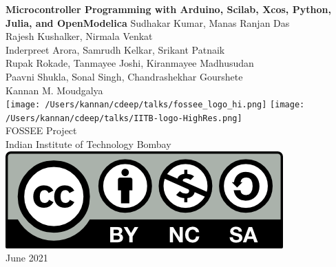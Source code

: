 \begin{center}
{\bf {\Huge Microcontroller Programming with Arduino, Scilab, Xcos,
    Python, Julia, and OpenModelica}}
\vfill
%
Sudhakar Kumar, Manas Ranjan Das \\
Rajesh Kushalker, Nirmala Venkat \\
Inderpreet Arora, Samrudh Kelkar, Srikant Patnaik \\
Rupak Rokade, Tanmayee Joshi, Kiranmayee Madhusudan \\
Paavni Shukla, Sonal Singh, Chandrashekhar Gourshete \\
Kannan M. Moudgalya \\
\vfill
\texttt{[image: /Users/kannan/cdeep/talks/fossee\_logo\_hi.png]} \quad
\texttt{[image: /Users/kannan/cdeep/talks/IITB-logo-HighRes.png]} \\
FOSSEE Project \\
Indian Institute of Technology Bombay \\ [2mm]
\includegraphics[width=0.15\linewidth]{by-nc-sa.png} \\ [1mm]
June 2021
\end{center}

\clearpage
